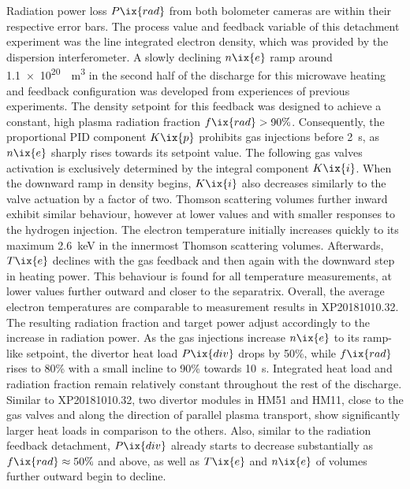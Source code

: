                 Radiation power loss $P\ix{rad}$ from both bolometer cameras are within their respective error bars. The process value and feedback variable of this detachment experiment was the line integrated electron density, which was provided by the dispersion interferometer. A slowly declining $n\ix{e}$ ramp around \SI[per-mode=reciprocal]{1.1e20}{\per\cubic\meter} in the second half of the discharge for this microwave heating and feedback configuration was developed from experiences of previous experiments. The density setpoint for this feedback was designed to achieve a constant, high plasma radiation fraction $f\ix{rad}>90\%$\cite{Krychowiak2021, Krychowiak2023}. Consequently, the proportional PID component $K\ix{p}$ prohibits gas injections before \SI{2}{\second}, as $n\ix{e}$ sharply rises towards its setpoint value. The following gas valves activation is exclusively determined by the integral component $K\ix{i}$. When the downward ramp in density begins, $K\ix{i}$ also decreases similarly to the valve actuation by a factor of two. Thomson scattering volumes further inward exhibit similar behaviour, however at lower values and with smaller responses to the hydrogen injection. The electron temperature initially increases quickly to its maximum \SI{2.6}{\kilo\electronvolt} in the innermost Thomson scattering volumes. Afterwards, $T\ix{e}$ declines with the gas feedback and then again with the downward step in heating power. This behaviour is found for all temperature measurements, at lower values further outward and closer to the separatrix. Overall, the average electron temperatures are comparable to measurement results in XP20181010.32.\\%
                The resulting radiation fraction and target power adjust accordingly to the increase in radiation power. As the gas injections increase $n\ix{e}$ to its ramp-like setpoint, the divertor heat load $P\ix{div}$ drops by 50\%, while $f\ix{rad}$ rises to 80\% with a small incline to 90\% towards \SI{10}{\second}. Integrated heat load and radiation fraction remain relatively constant throughout the rest of the discharge. Similar to XP20181010.32, two divertor modules in HM51 and HM11, close to the gas valves and along the direction of parallel plasma transport, show significantly larger heat loads in comparison to the others. Also, similar to the radiation feedback detachment, $P\ix{div}$ already starts to decrease substantially as $f\ix{rad}\approx50\%$ and above, as well as $T\ix{e}$ and $n\ix{e}$ of volumes further outward begin to decline.\\%
